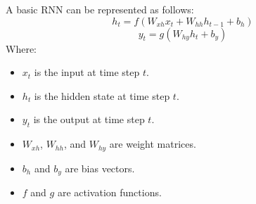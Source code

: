 \documentclass{ieeeojies}
\begin{document}
\begin {itemize}
 Layer}: Networks have multiple hidden layers.
    \item \textbf{Output Layer}: Networks have only one output layer.
\end {itemize}
A basic RNN can be represented as follows:
\begin{dmath*}
    h_t = f(W_{xh} x_t + W_{hh} h_{t-1} + b_h)
\end{dmath*}
\begin{dmath*}
    y_t = g(W_{hy} h_t + b_y)
\end{dmath*}
Where:\begin {itemize}
\item \(x_t\) is the input at time step \(t\).
\item \(h_t\) is the hidden state at time step \(t\).
\item \(y_t\) is the output at time step \(t\).
\item \(W_{xh}\), \(W_{hh}\), and \(W_{hy}\) are weight matrices.
\item \(b_h\) and \(b_y\) are bias vectors.
\item \(f\) and \(g\) are activation functions.
\end{itemize}
\end{document}

